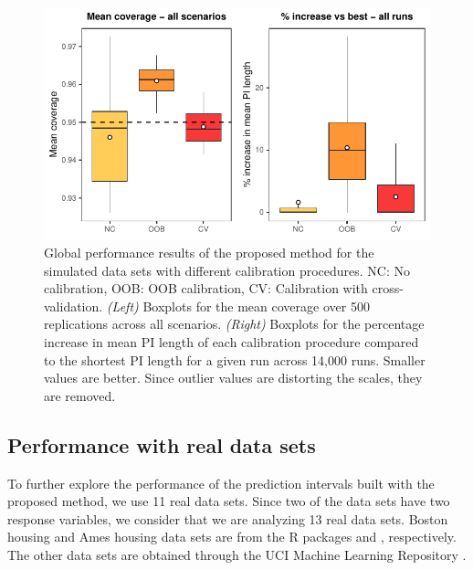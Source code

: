 \begin{figure}[htbp]
  \centering
  \includegraphics[scale=0.8]{global_our.pdf}
  \caption{Global performance results of the proposed method for the simulated data sets with different calibration procedures. NC: No calibration, OOB: OOB calibration, CV: Calibration with cross-validation. \emph{(Left)} Boxplots for the mean coverage over 500 replications across all scenarios. \emph{(Right)} Boxplots for the percentage increase in mean PI length of each calibration procedure compared to the shortest PI length for a given run across 14,000 runs. Smaller values are better. Since outlier values are distorting the scales, they are removed. }
  \label{figure:calib}
\end{figure}

\subsection{Performance with real data sets}

To further explore the performance of the prediction intervals built with the proposed method, we use 11 real data sets. Since two of the data sets have two response variables, we consider that we are analyzing 13 real data sets. Boston housing and Ames housing data sets are from the R packages  and , respectively. The other data sets are obtained through the UCI Machine Learning Repository \citep{ucirepo}.


